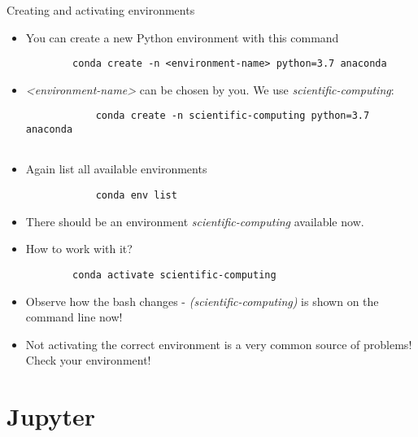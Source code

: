 \begin{frame}[fragile]{Creating and activating environments}
	
	\begin{itemize}
		\item You can create a new Python environment with this command
		\begin{verbatim}
		conda create -n <environment-name> python=3.7 anaconda
		\end{verbatim}
		
		\item \textit{<environment-name>} can be chosen by you. We use \textit{scientific-computing}: 
		\begin{verbatim}
			conda create -n scientific-computing python=3.7 anaconda
		
		\end{verbatim}
		
		\item Again list all available environments
			\begin{verbatim}
			conda env list
			\end{verbatim}
		\item There should be an environment \textit{scientific-computing} available now.
		\item How to work with it? 
		\begin{verbatim}
		conda activate scientific-computing
		\end{verbatim}
		\item Observe how the bash changes - \textit{(scientific-computing)} is shown on the command line now!
		\item Not activating the correct environment is a very common source of problems! Check your environment! 
		
	\end{itemize}
	
\end{frame}


\section{Jupyter}

